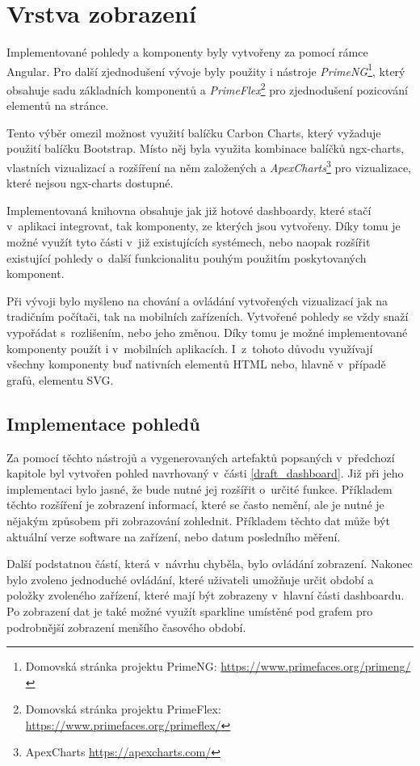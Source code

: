 \section{Vrstva zobrazení}
Implementované pohledy a komponenty byly vytvořeny za pomocí rámce Angular. Pro další zjednodušení vývoje byly použity i nástroje \textit{PrimeNG}\footnote{Domovská stránka projektu PrimeNG: \url{https://www.primefaces.org/primeng/}}, který obsahuje sadu základních komponentů a \textit{PrimeFlex}\footnote{Domovská stránka projektu PrimeFlex: \url{https://www.primefaces.org/primeflex/}} pro zjednodušení pozicování elementů na stránce.

Tento výběr omezil možnost využití balíčku Carbon Charts, který vyžaduje použití balíčku Bootstrap. Místo něj byla využita kombinace balíčků ngx-charts, vlastních vizualizací a rozšíření na něm založených a \textit{ApexCharts}\footnote{ApexCharts \url{https://apexcharts.com/}} pro vizualizace, které nejsou ngx-charts dostupné.

Implementovaná knihovna obsahuje jak již hotové dashboardy, které stačí v~aplikaci integrovat, tak komponenty, ze kterých jsou vytvořeny. Díky tomu je možné využít tyto části v~již existujících systémech, nebo naopak rozšířit existující pohledy o~další funkcionalitu pouhým použitím poskytovaných komponent.

Při vývoji bylo myšleno na chování a ovládání vytvořených vizualizací jak na tradičním počítači, tak na mobilních zařízeních. Vytvořené pohledy se vždy snaží vypořádat s~rozlišením, nebo jeho změnou. Díky tomu je možné implementované komponenty použít i v~mobilních aplikacích. I~z~tohoto důvodu využívají všechny komponenty buď nativních elementů HTML nebo, hlavně v~případě grafů, elementu SVG.

\subsection{Implementace pohledů}
Za pomocí těchto nástrojů a vygenerovaných artefaktů popsaných v~předchozí kapitole byl vytvořen pohled navrhovaný v~části \ref{draft_dashboard}. Již při jeho implementaci bylo jasné, že bude nutné jej rozšířit o~určité funkce. Příkladem těchto rozšíření je zobrazení informací, které se často nemění, ale je nutné je nějakým způsobem při zobrazování zohlednit. Příkladem těchto dat může být aktuální verze software na zařízení, nebo datum posledního měření.

Další podstatnou částí, která v~návrhu chyběla, bylo ovládání zobrazení. Nakonec bylo zvoleno jednoduché ovládání, které uživateli umožňuje určit období a položky zvoleného zařízení, které mají být zobrazeny v~hlavní části dashboardu. Po zobrazení dat je také možné využít sparkline umístěné pod grafem pro podrobnější zobrazení menšího časového období. 

